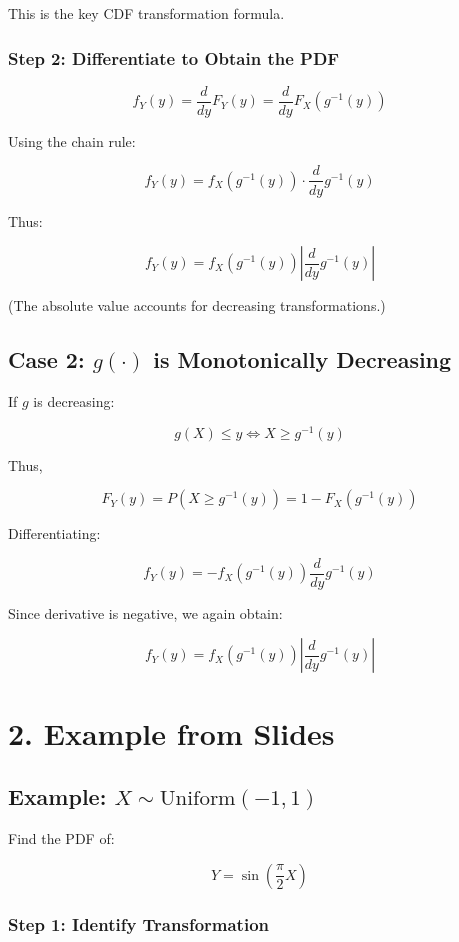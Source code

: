 \documentclass[12pt]{article}
\begin{document}
This is the key CDF transformation formula.

\subsubsection*{Step 2: Differentiate to Obtain the PDF}

\[
f_Y(y) = \frac{d}{dy} F_Y(y)
= \frac{d}{dy} F_X(g^{-1}(y))
\]

Using the chain rule:

\[
f_Y(y)
= f_X(g^{-1}(y)) \cdot \frac{d}{dy} g^{-1}(y)
\]

Thus:

\[
\boxed{
f_Y(y) = f_X(g^{-1}(y)) 
\left| \frac{d}{dy} g^{-1}(y) \right|
}
\]

(The absolute value accounts for decreasing transformations.)

\subsection*{Case 2: $g(\cdot)$ is Monotonically Decreasing}

If $g$ is decreasing:

\[
g(X) \le y \Longleftrightarrow X \ge g^{-1}(y)
\]

Thus,

\[
F_Y(y) = P(X \ge g^{-1}(y))
= 1 - F_X(g^{-1}(y))
\]

Differentiating:

\[
f_Y(y)
= - f_X(g^{-1}(y)) \frac{d}{dy} g^{-1}(y)
\]

Since derivative is negative, we again obtain:

\[
\boxed{
f_Y(y) = f_X(g^{-1}(y)) 
\left| \frac{d}{dy} g^{-1}(y) \right|
}
\]

\section*{2. Example from Slides}

\subsection*{Example: $X \sim \text{Uniform}(-1,1)$}

Find the PDF of:

\[
Y = \sin\left(\frac{\pi}{2}X\right)
\]

\subsubsection*{Step 1: Identify Transformation}
\end{document}
